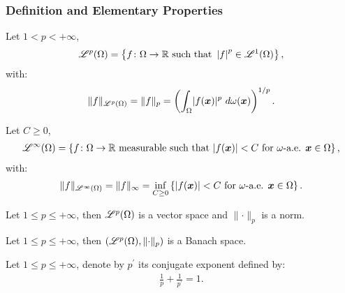 \subsubsection{Definition and Elementary Properties}

\begin{definition}
    Let $1 < p < +\infty$,
    \begin{gather}
        \mathscr{L}^{p}(\Omega) = \left\{ f \colon \Omega \rightarrow \mathbb{R} \text{ such that } \left| f \right|^p \in \mathscr{L}^{1}(\Omega) \right\},
    \end{gather}
    with:
    \begin{gather}
    \lVert f \rVert_{\mathscr{L}^{p}(\Omega)} = \lVert f \rVert_{p} = \left( \int_{\Omega} \lvert f(\bm{x}) \rvert^p ~ d \omega(\bm{x}) \right)^{1/p}.
    \end{gather}
\end{definition}

\begin{definition}[$\SpaceLp{\infty}(\Omega)$]
    Let $C \geq 0$,
    \begin{gather}
        \mathscr{L}^{\infty}(\Omega) = \left\{ f \colon \Omega \rightarrow \mathbb{R} \text{ measurable such that } \lvert f(\bm{x}) \rvert < C \text{ for } \omega \text{-a.e. } \bm{x} \in \Omega \right\},
    \end{gather}
    with:
    \begin{gather}
    \lVert f \rVert_{\mathscr{L}^{\infty}(\Omega)} = \lVert f \rVert_{\infty} = \inf_{C \geq 0} \left\{ \lvert f(\bm{x}) \rvert < C \text{ for } \omega \text{-a.e. } \bm{x} \in \Omega \right\}.
    \end{gather}
\end{definition}

\begin{theorem}
    Let $1 \leq p \leq +\infty$, then $\mathscr{L}^{p}(\Omega)$ is a vector space and $\lVert \cdot \rVert_p$ is a norm.
\end{theorem}

\begin{theorem}
    Let $1 \leq p \leq +\infty$, then $(\mathscr{L}^{p}(\Omega), \lVert \cdot \rVert_p)$ is a Banach space.
\end{theorem}

\begin{definition}
    Let $1 \leq p \leq +\infty$, denote by $p^{\prime}$ its conjugate exponent defined by:
    \begin{gather}
        \frac{1}{p} + \frac{1}{p^{\prime}} = 1.
    \end{gather}
\end{definition}

